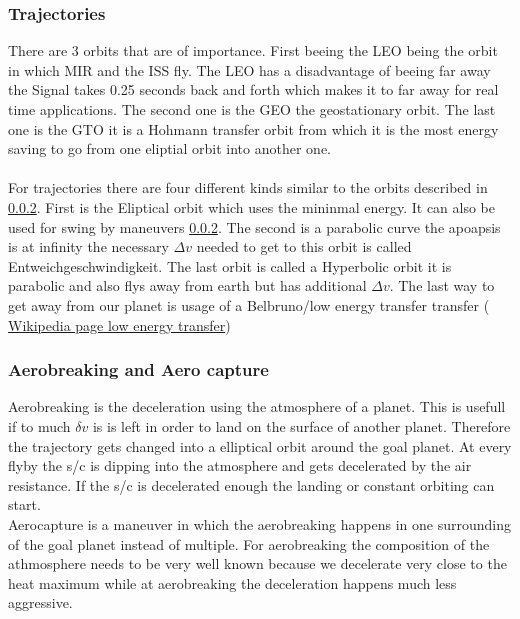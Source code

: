 \subsubsection{Trajectories}
There are 3 orbits that are of importance. First beeing the \ac{LEO} being the orbit in which MIR and the ISS fly. The \ac{LEO} has a disadvantage of beeing far away the Signal takes 0.25 seconds back and forth which makes it to far away for real time applications. The second one is the \ac{GEO} the geostationary orbit. The last one is the \ac{GTO} it is a Hohmann transfer orbit from which it is the most energy saving to go from one eliptial orbit into another one. \\\\ For trajectories there are four different kinds similar to the orbits described in \ref{}. First is the Eliptical orbit which uses the mininmal energy. It can also be used for swing by maneuvers \ref{}. The second is a parabolic curve the apoapsis is at infinity the necessary $\Delta v$ needed to get to this orbit is called Entweichgeschwindigkeit. The last orbit is called a Hyperbolic orbit it is parabolic and also flys away from earth but has additional $\Delta v$. The last way to get away from our planet is usage of a Belbruno/low energy transfer transfer (
\href{https://en.wikipedia.org/wiki/Low-energy_transfer}{Wikipedia page low energy transfer}) 

\subsubsection{Aerobreaking and Aero capture}
Aerobreaking is the deceleration using the atmosphere of a planet. This is usefull if to much $\delta v$ is is left in order to land on the surface of another planet. Therefore the trajectory gets changed into a elliptical orbit around the goal planet. At every flyby the \ac{s/c} is dipping into the atmosphere and gets decelerated by the air resistance. If the \ac{s/c} is decelerated enough the landing or constant orbiting can start.\\Aerocapture is a maneuver in which the aerobreaking happens in one surrounding of the goal planet instead of multiple. For aerobreaking the composition of the athmosphere needs to be very well known because we decelerate very close to the heat maximum while at aerobreaking the deceleration happens much less aggressive.

